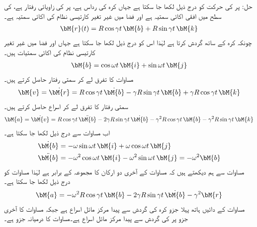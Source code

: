 حل: پر  کی حرکت کو درج ذیل لکھا جا سکتا ہے جہاں کرہ کی رداس  ہے،  پر  کی زاویائی رفتار  ہے،   کی سطح میں  افقی اکائی سمتیہ ہے اور  فضا میں غیر تغیر کارتیسی نظام کی اکائی سمتیہ ہے۔
\begin{align}\label{مساوات_الاحصاء_دو_گردش_الف}
\bM{r}(t)=R\cos \gamma t\,\bM{b}+R\sin \gamma t\,\bM{k}
\end{align}
چونکہ  کرہ کے ساتھ گردش کرتا ہے لہٰذا اس کو درج ذیل لکھا جا سکتا ہے جہاں  اور  فضا میں غیر تغیر کارتیسی نظام کی اکائی سمتیات ہیں۔
\begin{align}\label{مساوات_الاحصاء_دو_گردش_ب}
\bM{b}=\cos \omega t\,\bM{i}+\sin \omega t\,\bM{j}
\end{align}
مساوات  کا تفرق لے کر سمتی رفتار حاصل کرتے ہیں۔
\begin{align}\label{مساوات_الاحصاء_دو_گردش_پ}
\bM{v}=\dot{\bM{r}}=R\cos \gamma t \, \dot{\bM{b}}-\gamma R\sin \gamma t \, \bM{b}+\gamma R\cos \gamma t\,\bM{k}
\end{align}
سمتی رفتار کا تفرق لے کر اسراع حاصل کرتے ہیں۔
\begin{align}\label{مساوات_الاحصاء_دو_گردش_ت}
\bM{a}=\dot{\bM{v}}=R\cos \gamma t \,\ddot{\bM{b}}-2\gamma R\sin \gamma t\,\dot{\bM{b}}-\gamma^2 R\cos \gamma t\,\bM{b}-\gamma^2 R \sin \gamma t\,\bM{k}
\end{align}
اب مساوات  سے درج ذیل لکھا جا سکتا ہے۔
\begin{align*}
\dot{\bM{b}}&=-\omega \sin \omega t\,\bM{i}+\omega \cos \omega t\,\bM{j}\\
\ddot{\bM{b}}&=-\omega^2\cos \omega t\,\bM{i}-\omega^2\sin \omega t\,\bM{j}=-\omega^2\bM{b}
\end{align*}
مساوات  سے ہم دیکھتے ہیں کہ مساوات   کے آخری دو ارکان کا مجموعہ  کے برابر ہے لہٰذا مساوات  کو درج ذیل لکھا جا سکتا ہے۔
\begin{align}\label{مساوات_الاحصاء_دو_گردش_ٹ}
\bM{a}=-\omega^2R\cos \gamma t\,\bM{b}-2\gamma R\sin \gamma t \,\dot{\bM{b}}-\gamma^2\bM{r}
\end{align}
مساوات  کے دائیں ہاتھ پہلا جزو کرہ کی گردش سے پیدا مرکز مائل اسراع ہے جبکہ مساوات کا آخری جزو  پر  کی گردش سے پیدا مرکز مائل اسراع ہے۔مساوات کا درمیانہ جزو     ہے۔
